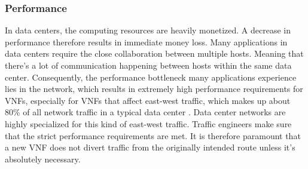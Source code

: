 \subsubsection{Performance}
In data centers, the computing resources are heavily monetized. A decrease in performance therefore results in immediate money loss. Many applications in data centers require the close collaboration between multiple hosts. Meaning that there's a lot of communication happening between hosts within the same data center. Consequently,  the performance bottleneck many applications experience lies in the network, which results in extremely high performance requirements for \acsp{VNF}, especially for \acsp{VNF} that affect east-west traffic, which makes up about 80\% of all network traffic in a typical data center \cite{talpurnetwork}. Data center networks are highly specialized for this kind of east-west traffic. Traffic engineers make sure that the strict performance requirements are met. It is therefore paramount that a new \acs{VNF} does not divert traffic from the originally intended route unless it's absolutely necessary.


